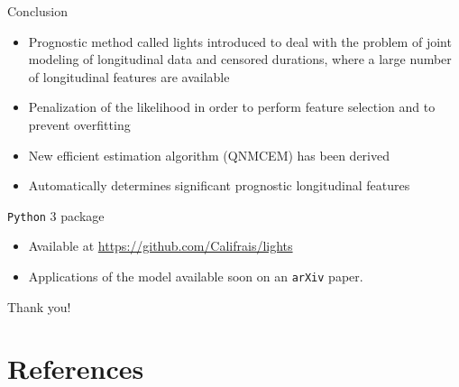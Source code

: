 \documentclass{beamer}
\begin{document}
\begin{frame}{Conclusion}

\begin{itemize}
  \item Prognostic method called lights introduced to deal with the problem of joint modeling of longitudinal data and censored durations, where a large number of longitudinal features are available
  \item Penalization of the likelihood in order to perform feature selection and to prevent overfitting
  \item New efficient estimation algorithm (QNMCEM) has been derived
  \item Automatically determines significant prognostic longitudinal features
\end{itemize}

\begin{block}{\texttt{Python} 3 package}
\begin{itemize}
  \item Available at \small{\url{https://github.com/Califrais/lights}}
  \item Applications of the model available soon on an \texttt{arXiv} paper.
\end{itemize}
\end{block}

\end{frame}

\begin{frame}[noframenumbering]
\Large \centering
\textcolor{blue_pres}{} Thank you!
\end{frame}

\section{References}
\end{document}
